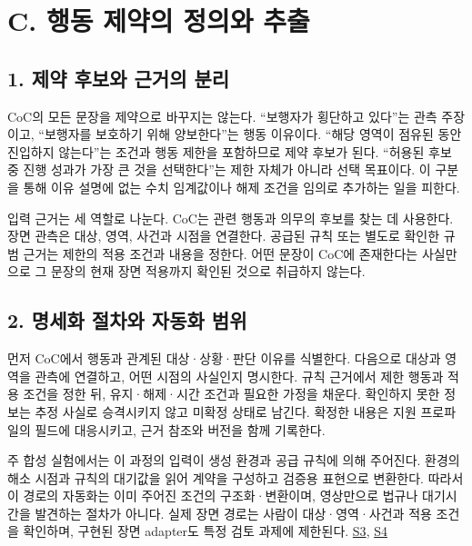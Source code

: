\documentclass[11pt,a4paper]{article}
\begin{document}
\section*{C. 행동 제약의 정의와 추출}

\subsection*{1. 제약 후보와 근거의 분리}

CoC의 모든 문장을 제약으로 바꾸지는 않는다. “보행자가 횡단하고 있다”는 관측 주장이고, “보행자를 보호하기 위해 양보한다”는 행동 이유이다. “해당 영역이 점유된 동안 진입하지 않는다”는 조건과 행동 제한을 포함하므로 제약 후보가 된다. “허용된 후보 중 진행 성과가 가장 큰 것을 선택한다”는 제한 자체가 아니라 선택 목표이다. 이 구분을 통해 이유 설명에 없는 수치 임계값이나 해제 조건을 임의로 추가하는 일을 피한다.\par

입력 근거는 세 역할로 나눈다. CoC는 관련 행동과 의무의 후보를 찾는 데 사용한다. 장면 관측은 대상, 영역, 사건과 시점을 연결한다. 공급된 규칙 또는 별도로 확인한 규범 근거는 제한의 적용 조건과 내용을 정한다. 어떤 문장이 CoC에 존재한다는 사실만으로 그 문장의 현재 장면 적용까지 확인된 것으로 취급하지 않는다.\par

\subsection*{2. 명세화 절차와 자동화 범위}

먼저 CoC에서 행동과 관계된 대상·상황·판단 이유를 식별한다. 다음으로 대상과 영역을 관측에 연결하고, 어떤 시점의 사실인지 명시한다. 규칙 근거에서 제한 행동과 적용 조건을 정한 뒤, 유지·해제·시간 조건과 필요한 가정을 채운다. 확인하지 못한 정보는 추정 사실로 승격시키지 않고 미확정 상태로 남긴다. 확정한 내용은 지원 프로파일의 필드에 대응시키고, 근거 참조와 버전을 함께 기록한다.\par

주 합성 실험에서는 이 과정의 입력이 생성 환경과 공급 규칙에 의해 주어진다. 환경의 해소 시점과 규칙의 대기값을 읽어 계약을 구성하고 검증용 표현으로 변환한다. 따라서 이 경로의 자동화는 이미 주어진 조건의 구조화·변환이며, 영상만으로 법규나 대기시간을 발견하는 절차가 아니다. 실제 장면 경로는 사람이 대상·영역·사건과 적용 조건을 확인하며, 구현된 장면 adapter도 특정 검토 과제에 제한된다. \href{\detokenize{../../../../../../projects/04-guardsynth-coc/experiments/paper1_cnl_learning/temporal_training_data.py}}{S3}, \href{\detokenize{../../../../../../projects/04-guardsynth-coc/src/guard_synth/qualitative_scene_contract.py}}{S4}\par
\end{document}
